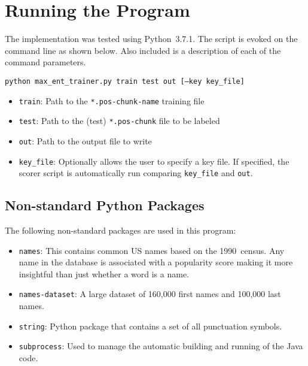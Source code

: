 \documentclass{article}
\begin{document}
  \section{Running the Program}

  The implementation was tested using Python~3.7.1.  The script is evoked on the command line as shown below.  Also included is a description of each of the command parameters.

  \begin{center}
    \texttt{python max\_ent\_trainer.py train test out [--key key\_file]}
  \end{center}

  \begin{itemize}
    \item \texttt{train}: Path to the \texttt{*.pos-chunk-name} training file
    \item \texttt{test}: Path to the (test) \texttt{*.pos-chunk} file to be labeled
    \item \texttt{out}: Path to the output file to write
    \item \texttt{key\_file}: Optionally allows the user to specify a key file.  If specified, the scorer script is automatically run comparing \texttt{key\_file} and \texttt{out}.
  \end{itemize}

  \subsection{Non-standard Python Packages}

  The following non-standard packages are used in this program:

  \begin{itemize}
    \item \texttt{names}: This contains common US names based on the 1990~census. Any name in the database is associated with a popularity score making it more insightful than just whether a word is a name.
    \item \texttt{names-dataset}: A large dataset of 160,000 first names and 100,000 last names.
    \item \texttt{string}: Python package that contains a set of all punctuation symbols.
    \item \texttt{subprocess}: Used to manage the automatic building and running of the Java code.
  \end{itemize}
\end{document}
